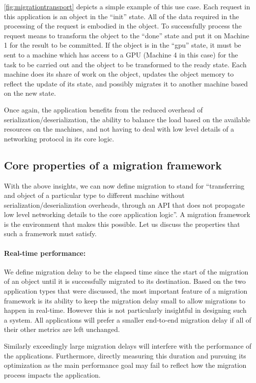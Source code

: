\autoref{fig:migrationtransport} depicts a simple example of this use case.
Each request in this application is an object in the ``init'' state. All of the
data required in the processing of the request is embodied in the object.
To successfully process the request means to transform the object to the
``done'' state and put it on Machine 1 for the result to be committed.
If the object is in the ``gpu'' state, it must be sent to a machine which has access to a
GPU (Machine 4 in this case) for the task to be carried out and the object to be
transformed to the ready state. Each machine does its share of work on the
object, updates the object memory to reflect the update of its state, and
possibly migrates it to another machine based on the new state.

Once again, the application benefits from the reduced overhead of
serialization/deserialization, the ability to balance the load based on the
available resources on the machines, and not having to deal with low level
details of a networking protocol in its core logic.

\subsection{Core properties of a migration framework}
\label{subsec:coreprops}
With the above insights, we can now define migration to stand for
``transferring and object of a particular type to different machine without
serialization/deserialization overheads, through an API that does not
propagate low level networking details to the core application logic''. A
migration framework is the environment that makes this possible. Let us
discuss the properties that such a framework must satisfy.

\paragraph{Real-time performance:}
We define migration delay to be the elapsed time since the start of the
migration of an object until it is successfully migrated to its
destination. Based on the two application types that were discussed,
the most
important feature of a migration framework is its ability to keep the
migration delay small to allow migrations to happen in real-time.
However this is not particularly insightful in designing such a system.
All applications will prefer a smaller end-to-end migration delay
if all of their other metrics are left unchanged.

Similarly exceedingly
    large migration delays will interfere with the performance of
    the applications. Furthermore, directly measuring this
    duration and pursuing its optimization as the main performance goal
    may fail to reflect how the migration process impacts the application.

